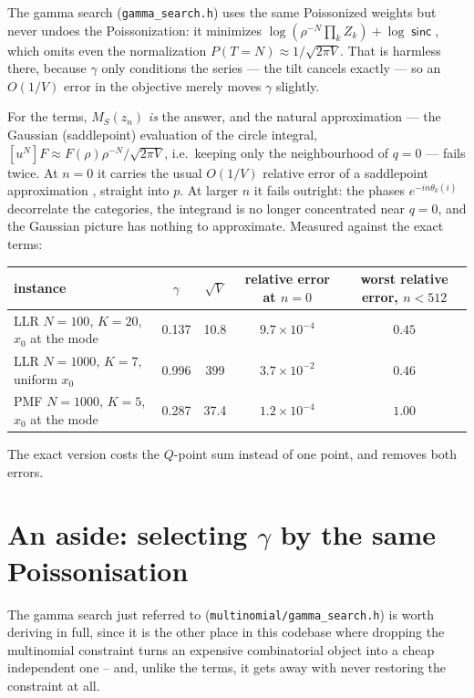 \documentclass[11pt]{article}
\newcommand{\sinck}{\operatorname{\mathsf{sinc}}}
\newcommand{\coef}[1]{[u^{#1}]}
\begin{document}
The gamma search (\texttt{gamma\_search.h}) uses the same Poissonized weights but never undoes the
Poissonization: it minimizes $\log(\rho^{-N}\prod_kZ_k)+\log\sinck$, which omits even the
normalization $P(T=N)\approx1/\sqrt{2\pi V}$. That is harmless there, because $\gamma$ only
conditions the series --- the tilt cancels exactly --- so an $O(1/V)$ error in the objective merely
moves $\gamma$ slightly.

For the terms, $M_S(z_n)$ \emph{is} the answer, and the natural approximation --- the Gaussian
(saddlepoint) evaluation of the circle integral,
$\coef N F\approx F(\rho)\rho^{-N}/\sqrt{2\pi V}$, i.e.\ keeping only the neighbourhood of $q=0$ ---
fails twice. At $n=0$ it carries the usual $O(1/V)$ relative error of a saddlepoint approximation
\citep{daniels1954}, straight into $p$. At larger $n$ it fails outright: the phases
$e^{-in\theta_k(i)}$ decorrelate the categories, the integrand is no longer concentrated near
$q=0$, and the Gaussian picture has nothing to approximate. Measured against the exact terms:

\begin{center}
\small
\begin{tabular}{lcccc}
\toprule
instance & $\gamma$ & $\sqrt V$ & relative error at $n=0$ & worst relative error, $n<512$ \\
\midrule
LLR $N=100$, $K=20$, $x_0$ at the mode      & 0.137 & 10.8  & $9.7\times10^{-4}$ & $0.45$ \\
LLR $N=1000$, $K=7$, uniform $x_0$          & 0.996 & 399   & $3.7\times10^{-2}$ & $0.46$ \\
PMF $N=1000$, $K=5$, $x_0$ at the mode      & 0.287 & 37.4  & $1.2\times10^{-4}$ & $1.00$ \\
\bottomrule
\end{tabular}
\end{center}

The exact version costs the $Q$-point sum instead of one point, and removes both errors.

\section{An aside: selecting $\gamma$ by the same Poissonisation}
\label{sec:gamma}

The gamma search just referred to (\texttt{multinomial/gamma\_search.h}) is worth deriving in full,
since it is the other place in this codebase where dropping the multinomial constraint turns an
expensive combinatorial object into a cheap independent one -- and, unlike the terms, it gets away
with never restoring the constraint at all.
\end{document}
